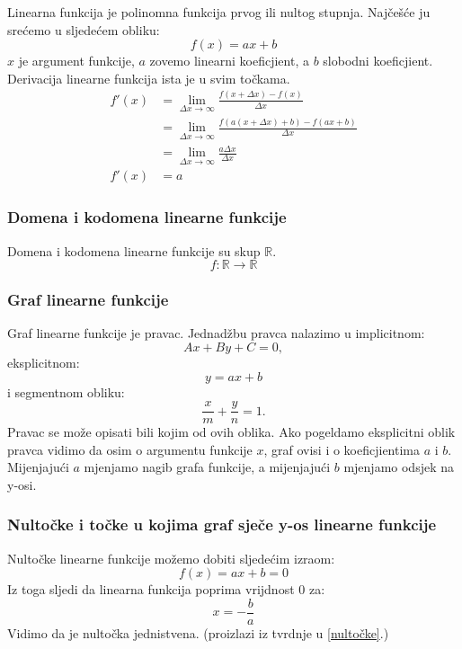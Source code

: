 \newcommand{\lin}{linearne funkcije}

Linearna funkcija je polinomna funkcija prvog ili nultog stupnja.
Najčešće ju srećemo u sljedećem obliku:
\[f(x) = ax + b\]
\(x\) je argument funkcije, \(a\) zovemo linearni koeficjient, a \(b\) slobodni koeficjient.
Derivacija linearne funkcija ista je u svim točkama.
\begin{equation*}
    \begin{split}
        f'(x)   & = \lim_{\Delta x\to\infty} \frac{f(x + \Delta x) - f(x)}{\Delta x} \\
                & = \lim_{\Delta x\to\infty} \frac{f(a(x + \Delta x) + b) - f(ax + b)}{\Delta x} \\
                & = \lim_{\Delta x\to\infty} \frac{a\Delta x}{\Delta x} \\
        f'(x)   & = a
    \end{split}
\end{equation*}

\subsubsection{Domena i kodomena \lin}
    Domena i kodomena linearne funkcije su skup $\mathbb{R}$.
    \[f \colon \mathbb{R} \to \mathbb{R}\]

\subsubsection{Graf \lin}
    Graf linearne funkcije je pravac. Jednadžbu pravca nalazimo u implicitnom:
    \[Ax + By + C = 0,\]
    eksplicitnom:
    \[y = ax + b\]
    i segmentnom obliku:
    \[\frac{x}{m} + \frac{y}{n} = 1.\]
    Pravac se može opisati bili kojim od ovih oblika.
    Ako pogeldamo eksplicitni oblik pravca vidimo da osim o argumentu funkcije \(x\), graf ovisi i o koeficjientima \(a\) i \(b\).
    Mijenjajući \(a\) mjenjamo nagib grafa funkcije, a mijenjajući \(b\) mjenjamo odsjek na y-osi.

\subsubsection{Nultočke i točke u kojima graf sječe y-os \lin}
    Nultočke linearne funkcije možemo dobiti sljedećim izraom:
    \[f(x) = ax + b = 0\]
    Iz toga sljedi da linearna funkcija poprima vrijdnost 0 za:
    \[x = -\frac{b}{a}\]
    Vidimo da je nultočka jednistvena. (proizlazi iz tvrdnje u \ref{nultočke}.)
    

